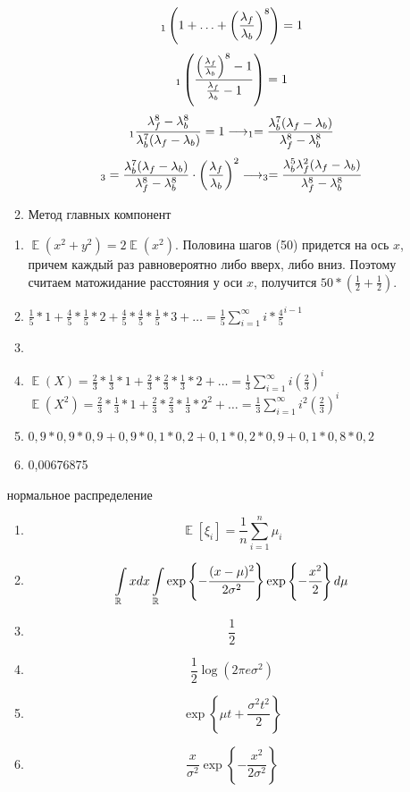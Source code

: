 \documentclass[11pt, a4paper]{article}
\DeclareMathOperator{\E}{\mathbb{E}}
\let\P\relax
\DeclareMathOperator{\P}{\mathbb{P}}
\def \R{\mathbb{R}}
\theoremstyle{definition}
\begin{document}
\begin{enumerate}
\begin{enumerate}
    \[
    \P_1 \left(1 + \ldots + \left( \frac{\lambda_f}{\lambda_b}\right)^8 \right) = 1
    \]
    \[
    \P_1 \left( \frac{\left( \frac{\lambda_f}{\lambda_b}\right)^8 - 1}{\frac{\lambda_f}{\lambda_b} - 1}\right) = 1
    \]
    \[
    \P_1 \frac{\lambda_f^8 - \lambda_b^8}{\lambda_b^7 (\lambda_f - \lambda_b)} = 1 \longrightarrow \P_1 = \frac{\lambda_b^7 (\lambda_f - \lambda_b)}{\lambda_f^8 - \lambda_b^8}
    \] 
    \[
    \P_3 = \frac{\lambda_b^7 (\lambda_f - \lambda_b)}{\lambda_f^8 - \lambda_b^8} \cdot \left( \frac{\lambda_f}{\lambda_b}\right)^2 \longrightarrow
    \P_3 = \frac{\lambda_b^5 \lambda_f^2 (\lambda_f - \lambda_b)}{\lambda_f^8 - \lambda_b^8}
    \]
    \item Метод главных компонент
\end{enumerate}  
\begin{enumerate}
    \item $\E(x^2+y^2) = 2\E(x^2)$. Половина шагов (50) придется на ось $x$, причем каждый раз равновероятно либо вверх, либо вниз. Поэтому считаем матожидание расстояния у оси $x$, получится $50*(\frac{1}{2} + \frac{1}{2})$.
    \item $\frac{1}{5}*1 + \frac{4}{5}*\frac{1}{5}*2 + \frac{4}{5}*\frac{4}{5}*\frac{1}{5}*3 + \ldots = \frac{1}{5} \sum_{i = 1}^{\infty}i*\frac{4}{5}^{i-1}$
    \item 
    \item $\E(X) = \frac{2}{3}*\frac{1}{3}*1 + \frac{2}{3}*\frac{2}{3}*\frac{1}{3}*2 + \ldots = \frac{1}{3} \sum_{i = 1}^{\infty} i(\frac{2}{3})^i$
    $\E(X^2) = \frac{2}{3}*\frac{1}{3}*1 + \frac{2}{3}*\frac{2}{3}*\frac{1}{3}*2^2 + \ldots = \frac{1}{3} \sum_{i = 1}^{\infty} i^2(\frac{2}{3})^i$
    \item $0,9*0,9*0,9 + 0,9*0,1*0,2 + 0,1*0,2*0,9 + 0,1*0,8*0,2$
    \item 0,00676875
\end{enumerate}    

нормальное распределение
\begin{enumerate}
    \item \[ \E [\xi_i]=\frac{1}{n}\sum\limits_{i=1}^n \mu_i \]
    \item \[ \int\limits_{\R} xdx \int\limits_{\R} \exp\left\{- \cfrac{(x-\mu)^2}{2\sigma^2} \right\} \exp\left\{- \cfrac{x^2}{2}\right\} d\mu \]
    \item \[ \frac{1}{2} \]
    \item \[ \frac{1}{2} \log(2\pi e\sigma^2) \]
    \item \[ \exp \left\{\mu t+\frac{\sigma^2t^2}{2} \right\} \]
    \item \[ \frac{x}{\sigma^2} \exp\left\{-\frac{x^2}{2\sigma^2} \right\} \]
\end{enumerate}
    
\end{enumerate}
\end{document}
